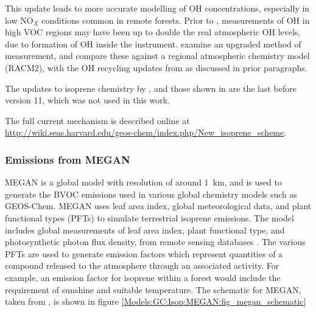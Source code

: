       This update leads to more accurate modelling of OH concentrations, especially in low NO$_X$ conditions common in remote forests.
      Prior to \citet{Mao2012}, measurements of OH in high VOC regions may have been up to double the real atmospheric OH levels, due to formation of OH inside the instrument.
      \citet{Mao2012} examine an upgraded method of measurement, and compare these against a regional atmospheric chemistry model (RACM2), with the OH recycling updates from \citet{Paulot2009b} as discussed in prior paragraphs.
      
      The updates to isoprene chemistry by \citet{Mao2013}, and those shown in \textcite{Crounse2011,Crounse2012} are the last before version 11, which was not used in this work.
      
      The full current mechanism is described online at \url{http://wiki.seas.harvard.edu/geos-chem/index.php/New_isoprene_scheme}.
    
    
    \subsubsection{Emissions from MEGAN}
      \label{Model:GC:Isop:MEGAN}

      MEGAN is a global model with resolution of around 1~km, and is used to generate the BVOC emissions used in various global chemistry models such as GEOS-Chem.
      MEGAN uses leaf area index, global meteorological data, and plant functional types (PFTs) to simulate terrestrial isoprene emissions.
      The model includes global measurements of leaf area index, plant functional type, and photosynthetic photon flux density, from remote sensing databases \parencite{Kefauver2014}.
      The various PFTs are used to generate emission factors which represent quantities of a compound released to the atmosphere through an associated activity.
      For example, an emission factor for isoprene within a forest would include the requirement of sunshine and suitable temperature.
      The schematic for MEGAN, taken from \citet{Megan_Website}, is shown in figure \ref{Models:GC:Isop:MEGAN:fig_megan_schematic}
      
